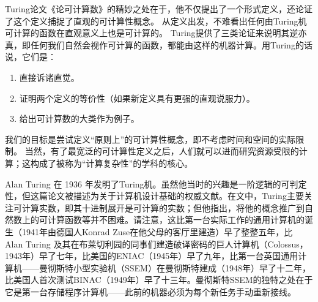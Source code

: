 \documentclass[../../../include/open-logic-section]{subfiles}
\begin{document}
\begin{digress}
Turing论文《论可计算数》的精妙之处在于，他不仅提出了一个形式定义，还论证了这个定义捕捉了直观的可计算性概念。
从定义出发，不难看出任何由Turing机可计算的函数在直观意义上也是可计算的。
Turing提供了三类论证来说明其逆亦真，即任何我们自然会视作可计算的函数，都能由这样的机器计算。用Turing的话说，它们是：
\begin{enumerate}
\item 直接诉诸直觉。
\item 证明两个定义的等价性（如果新定义具有更强的直观说服力）。
\item 给出可计算数的大类作为例子。
\end{enumerate}
我们的目标是尝试定义“原则上”的可计算性概念，即不考虑时间和空间的实际限制。
当然，有了最宽泛的可计算性定义之后，人们就可以进而研究资源受限的计算；这构成了被称为“计算复杂性”的学科的核心。
\end{digress}

\begin{history}
Alan Turing 在 1936 年发明了Turing机。虽然他当时的兴趣是一阶逻辑的可判定性，但这篇论文被描述为关于计算机设计基础的权威文献。在文中，Turing主要关注可计算实数，即其十进制展开是可计算的实数；但他指出，将他的概念推广到自然数上的可计算函数等并不困难。请注意，这比第一台实际工作的通用计算机的诞生（1941年由德国人Konrad Zuse在他父母的客厅里建造）早了整整五年，比 Alan Turing 及其在布莱切利园的同事们建造破译密码的巨人计算机（Colossus，1943年）早了七年，比美国的ENIAC（1945年）早了九年，比第一台英国通用计算机——曼彻斯特小型实验机（SSEM）在曼彻斯特建成（1948年）早了十二年，比美国人首次测试BINAC（1949年）早了十三年。曼彻斯特SSEM的独特之处在于它是第一台存储程序计算机——此前的机器必须为每个新任务手动重新接线。
\end{history}
\end{document}
